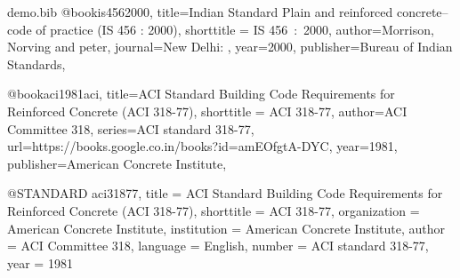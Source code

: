 \RequirePackage{filecontents}
\begin{filecontents*}{demo.bib}
@book{is4562000,
title={Indian Standard Plain and reinforced concrete--code of
        practice (IS 456 : 2000)},
shorttitle = {IS 456~:~2000},
author={Morrison, Norving and peter},
journal={New Delhi: },
year={2000},
publisher={Bureau of Indian Standards},
}

@book{aci1981aci,
title={ACI Standard Building Code Requirements for Reinforced
        Concrete (ACI 318-77)},
shorttitle = {ACI 318-77},
author={{ACI Committee 318}},
series={ACI standard 318-77},
url={https://books.google.co.in/books?id=amEOfgtA-DYC},
year=1981,
publisher={American Concrete Institute},
}   

@STANDARD {aci31877,
title        = {ACI Standard Building Code Requirements for
    Reinforced Concrete (ACI 318-77)},
shorttitle   = {ACI 318-77},
organization = {American Concrete Institute},
institution  = {American Concrete Institute},
author       = {{ACI Committee 318}},
language     = {English},
number       = {ACI standard 318-77},
year         = 1981
}   
\end{filecontents*}

\documentclass{article}

\usepackage[backend=biber]{biblatex}




\DeclareCiteCommand{\citepublisher}
  {\boolfalse{citetracker}%
    \boolfalse{pagetracker}%
    \usebibmacro{prenote}}
  {\printlist{publisher}}
  {\multicitedelim}
  {\usebibmacro{postnote}}



This is demo \cite{is4562000}

title : \\


\textbf{Enteres from @Book}\\


\textbf{Author shortname:} \citeauthor*{is4562000}

\textbf{Author Fullname:} \citeauthor{is4562000}\\

\cite{aci1981aci} = 




\textbf{Entries from @standard}
\cite{aci31877}\\


\textbf{@Standard title}= 

\textbf{@Standard author}= \citeauthor{aci31877}

\textbf{@Standard year}= \citeyear{aci31877}

\printbibliography




